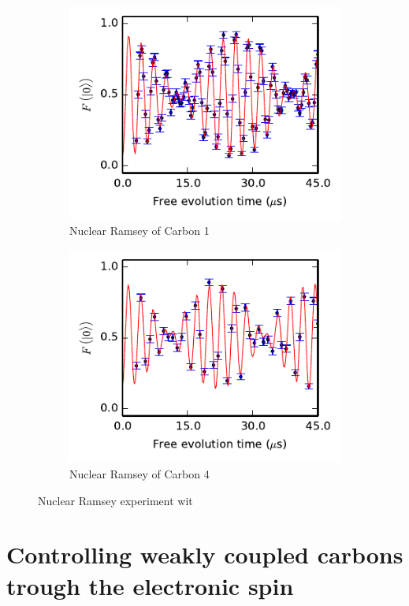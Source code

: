 \begin{figure}[htbp]
    \begin{subfigure}[t]{0.49\textwidth}\centering
    \includegraphics{Img/CarbonRamsey_C1.pdf}
    \caption{Nuclear Ramsey of Carbon 1} \label{fig:CR_C1}
    \end{subfigure}
    \begin{subfigure}[t]{0.49\textwidth}\centering
        \includegraphics{Img/CarbonRamsey_C4.pdf}
        \caption{Nuclear Ramsey of Carbon 4}
        \label{fig:CR_C4}
    \end{subfigure}
    \caption{Nuclear Ramsey experiment wit}
\end{figure}



\section{Controlling weakly coupled carbons trough the electronic spin}

